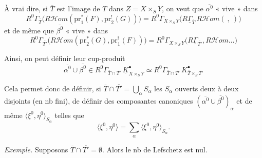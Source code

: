 \documentclass[11pt,a4paper]{article}
\begin{document}



À vrai dire, \struck{\ill{}} si $\overline{T}$ est l'image de $T$ dans
$Z = X \times_{S} Y$, on veut que $\overline{\alpha^{0}}$ « vive » dans
\[
  R^{0}\Gamma_{\overline{T}}\bigl(R\mathcal{H}om(\mathrm{pr}_{1}^{*}(F), \mathrm{pr}_{2}^{!}(G))\bigr)
  = R^{0}\Gamma_{X \times_{S} Y}\bigl(R\underline{\Gamma}_{\overline{T}}\, R\mathcal{H}om( \ , \ )\bigr)
\]
et de même que $\overline{\beta^{0}}$ « vive »  dans
\[
  R^{0}\Gamma_{\overline{T'}}\bigl(R\mathcal{H}om(\mathrm{pr}_{2}^{*}(G), \mathrm{pr}_{1}^{!}(F))\bigr)
  = R^{0}\Gamma_{X \times_{S} Y}\bigl(R\underline{\Gamma}_{\overline{T'}}, R\mathcal{H}om \ldots\bigr)
\]

Ainsi, on peut définir leur cup-produit
\[
  \overline{\alpha^{0}} \cup \overline{\beta^{0}}
  \in R^{0}\Gamma_{\overline{T} \cap \overline{T'}}\, \underline{K}^{\bullet}_{X \times_{S} Y}
  \simeq R^{0}\Gamma_{\overline{T} \cap \overline{T'}}\, K^{\bullet}_{\overline{T} \times_{S} \overline{T'}}
\]

Cela permet donc de définir, si
$\overline{T} \cap \overline{T'} = \bigcup_{\alpha} S_{\alpha}$ 
les $S_{\alpha}$ ouverts deux à deux disjoints (en nb fini), de définir des
composantes canoniques $(\overline{\alpha^{0}} \cup \overline{\beta^{0}})_{\alpha}$
\struck{\ill{}} et de même \struck{\ill{}} $\langle \xi^{0}, \eta^{0}\rangle_{S_{\alpha}}$
telles que
\[
  \langle \xi^{0}, \eta^{0}\rangle = \sum_{\alpha} \langle \xi^{0}, \eta^{0}\rangle_{S_{\alpha}} .
\]

\emph{Exemple.} Supposons $\overline{T} \cap \overline{T'} = \emptyset$. Alors
le nb de Lefschetz est nul.
\end{document}
